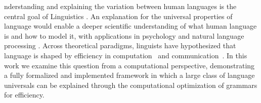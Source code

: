 \documentclass[9pt,twocolumn,twoside,lineno]{pnas-new}
\begin{document}


nderstanding and explaining the variation between human languages is the central  goal of Linguistics \cite{greenberg1963universals,chomsky1993lectures,givon2009genesis, ...}.
An explanation for the universal properties of language would enable a deeper scientific understanding of what human language is and how to model it, with applications in psychology and natural language processing \cite{hawkins2007processing,bender2009linguistically,bender2013linguistic}.
Across theoretical paradigms, linguists have hypothesized that language is shaped by efficiency in computation~\cite{chomsky2005three,hauser2002faculty, berwick1984grammatical,hawkins1994performance} and communication~\cite{zipf1949human, Croft:Cruse:2004, Goldberg:2005, pinker1990natural, smith2013linguistic}.
In this work we examine this question from a computational perspective, demonstrating a fully formalized and implemented framework in which a large class of language universals can be explained through the computational optimization of grammars for efficiency. %

%
%
%
%
%



\end{document}

